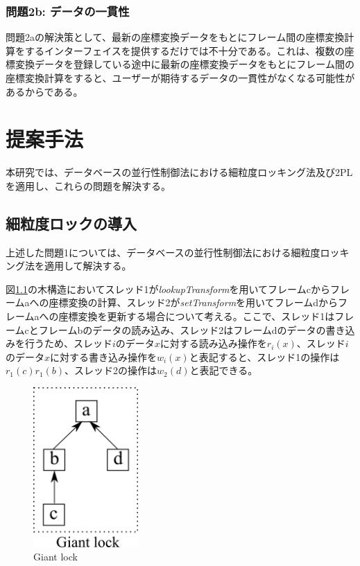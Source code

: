 \documentclass[a4paper]{jreport}	%
\begin{document}
\subsection*{問題2b: データの一貫性}
問題2aの解決策として、最新の座標変換データをもとにフレーム間の座標変換計算をするインターフェイスを提供するだけでは不十分である。これは、複数の座標変換データを登録している途中に最新の座標変換データをもとにフレーム間の座標変換計算をすると、ユーザーが期待するデータの一貫性がなくなる可能性があるからである。

\chapter{提案手法}
本研究では、データベースの並行性制御法における細粒度ロッキング法及び2PLを適用し、これらの問題を解決する。

\section{細粒度ロックの導入}
\label{section:intro-high-gran-lock}

上述した問題1については、データベースの並行性制御法における細粒度ロッキング法を適用して解決する。

図\ref{fig:giant-lock}の木構造においてスレッド1が\textit{lookupTransform}を用いてフレームcからフレームaへの座標変換の計算、スレッド2が\textit{setTransform}を用いてフレームdからフレームaへの座標変換を更新する場合について考える。ここで、スレッド1はフレームcとフレームbのデータの読み込み、スレッド2はフレームdのデータの書き込みを行うため、スレッド$i$のデータ$x$に対する読み込み操作を$r_i(x)$、スレッド$i$のデータ$x$に対する書き込み操作を$w_i(x)$と表記すると、スレッド1の操作は$r_1(c)r_1(b)$、スレッド2の操作は$w_2(d)$と表記できる。


\begin{figure}[h] 
\centering
\includegraphics[width=4cm]{gaint-lock}	
\caption{Giant lock}
\label{fig:giant-lock}
\end{figure}
\end{document}
